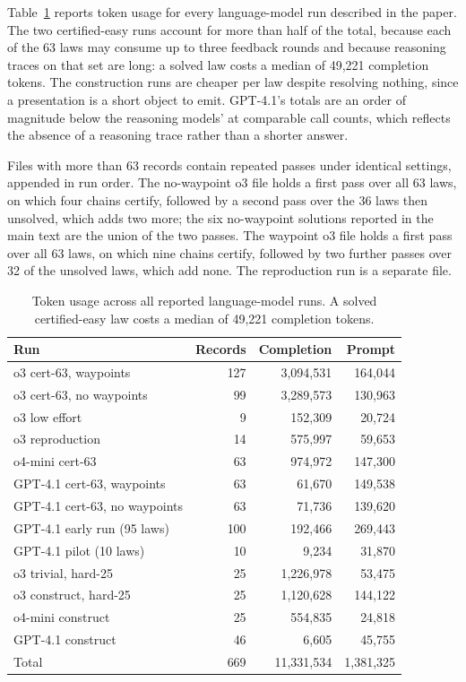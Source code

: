 \documentclass[letterpaper]{article}
\begin{document}
Table~\ref{tab:cost} reports token usage for every language-model run described
in the paper. The two certified-easy runs account for more than half of the
total, because each of the 63 laws may consume up to three feedback rounds and
because reasoning traces on that set are long: a solved law costs a median of
49,221 completion tokens. The construction runs are cheaper per law despite
resolving nothing, since a presentation is a short object to emit. GPT-4.1's
totals are an order of magnitude below the reasoning models' at comparable call
counts, which reflects the absence of a reasoning trace rather than a shorter
answer.

Files with more than 63 records contain repeated passes under identical
settings, appended in run order. The no-waypoint o3 file holds a first pass
over all 63 laws, on which four chains certify, followed by a second pass over
the 36 laws then unsolved, which adds two more; the six no-waypoint solutions
reported in the main text are the union of the two passes. The waypoint o3
file holds a first pass over all 63 laws, on which nine chains certify,
followed by two further passes over 32 of the unsolved laws, which add none.
The reproduction run is a separate file.

\begin{table}[t]
\centering
\begin{tabular}{@{}lrrr@{}}
\toprule
Run & Records & Completion & Prompt \\
\midrule
o3 cert-63, waypoints    & 127 & 3,094,531 & 164,044 \\
o3 cert-63, no waypoints & 99  & 3,289,573 & 130,963 \\
o3 low effort            & 9   & 152,309   & 20,724 \\
o3 reproduction          & 14  & 575,997   & 59,653 \\
o4-mini cert-63          & 63  & 974,972   & 147,300 \\
GPT-4.1 cert-63, waypoints    & 63 & 61,670 & 149,538 \\
GPT-4.1 cert-63, no waypoints & 63 & 71,736 & 139,620 \\
GPT-4.1 early run (95 laws)   & 100 & 192,466 & 269,443 \\
GPT-4.1 pilot (10 laws)  & 10  & 9,234     & 31,870 \\
o3 trivial, hard-25      & 25  & 1,226,978 & 53,475 \\
o3 construct, hard-25    & 25  & 1,120,628 & 144,122 \\
o4-mini construct        & 25  & 554,835   & 24,818 \\
GPT-4.1 construct        & 46  & 6,605     & 45,755 \\
\midrule
Total                    & 669 & 11,331,534 & 1,381,325 \\
\bottomrule
\end{tabular}
\caption{Token usage across all reported language-model runs. A solved
certified-easy law costs a median of 49,221 completion tokens.}
\label{tab:cost}
\end{table}

\end{document}
